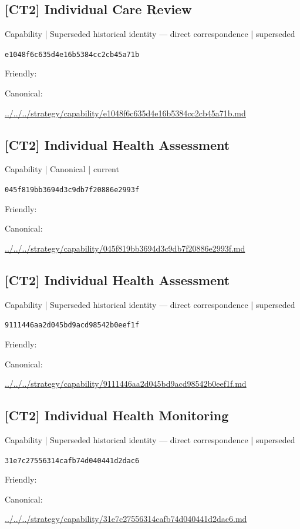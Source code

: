 \documentclass[10pt,a4paper]{article}
\begin{document}
\subsection*{[CT2] Individual Care Review}
{\small Capability | Superseded historical identity — direct correspondence | superseded}\par
\texttt{e1048f6c635d4e16b5384cc2cb45a71b}\par
Friendly: \par
Canonical: \par
{\footnotesize\url{../../../strategy/capability/e1048f6c635d4e16b5384cc2cb45a71b.md}}\par
\subsection*{[CT2] Individual Health Assessment}
{\small Capability | Canonical | current}\par
\texttt{045f819bb3694d3c9db7f20886e2993f}\par
Friendly: \par
Canonical: \par
{\footnotesize\url{../../../strategy/capability/045f819bb3694d3c9db7f20886e2993f.md}}\par
\subsection*{[CT2] Individual Health Assessment}
{\small Capability | Superseded historical identity — direct correspondence | superseded}\par
\texttt{9111446aa2d045bd9acd98542b0eef1f}\par
Friendly: \par
Canonical: \par
{\footnotesize\url{../../../strategy/capability/9111446aa2d045bd9acd98542b0eef1f.md}}\par
\subsection*{[CT2] Individual Health Monitoring}
{\small Capability | Superseded historical identity — direct correspondence | superseded}\par
\texttt{31e7c27556314cafb74d040441d2dac6}\par
Friendly: \par
Canonical: \par
{\footnotesize\url{../../../strategy/capability/31e7c27556314cafb74d040441d2dac6.md}}\par
\end{document}
